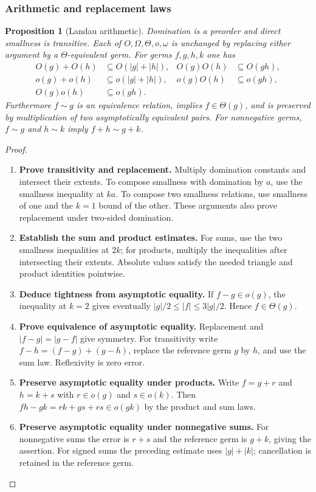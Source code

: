 \documentclass[11pt,a4paper]{article}
\numberwithin{algorithm}{section}
\numberwithin{equation}{section}
\newtheorem{proposition}[proposition]{Proposition}
\theoremstyle{definition}
\theoremstyle{remark}
\theoremstyle{plain}
\newcommand{\abs}[1]{\lvert #1\rvert}
\theoremstyle{definition}
\theoremstyle{plain}
\begin{document}
\subsubsection{Arithmetic and replacement laws}
\begin{proposition}[Landau arithmetic]\label{prop:landau-arithmetic}
Domination is a preorder and direct smallness is transitive.
Each of $O,\Omega,\Theta,o,\omega$ is unchanged by replacing
either argument by a $\Theta$-equivalent germ. For germs
$f,g,h,k$ one has
\[
\begin{aligned}
 O(g)+O(h)&\subseteq O(\abs g+\abs h),&
 O(g)O(h)&\subseteq O(gh),\\
 o(g)+o(h)&\subseteq o(\abs g+\abs h),&
 o(g)O(h)&\subseteq o(gh),\\
 O(g)o(h)&\subseteq o(gh).
\end{aligned}
\]
Furthermore $f\sim g$ is an equivalence relation, implies
$f\in\Theta(g)$, and is preserved by multiplication of two
asymptotically equivalent pairs. For nonnegative germs,
$f\sim g$ and $h\sim k$ imply $f+h\sim g+k$.
\end{proposition}
\begin{proof}\leavevmode
\begin{enumerate}[leftmargin=*,align=left]
\item \textbf{Prove transitivity and replacement.}
Multiply domination constants and intersect their extents.
To compose smallness with domination by $a$, use the smallness
inequality at $ka$. To compose two smallness relations, use
smallness of one and the $k=1$ bound of the other. These
arguments also prove replacement under two-sided domination.

\item \textbf{Establish the sum and product estimates.}
For sums, use the two smallness inequalities at $2k$;
for products, multiply the inequalities after intersecting
their extents. Absolute values satisfy the needed triangle
and product identities pointwise.

\item \textbf{Deduce tightness from asymptotic equality.}
If $f-g\in o(g)$, the
inequality at $k=2$ gives eventually
$\abs g/2\le\abs f\le3\abs g/2$. Hence $f\in\Theta(g)$.

\item \textbf{Prove equivalence of asymptotic equality.}
Replacement and $\abs{f-g}=\abs{g-f}$ give symmetry.
For transitivity write $f-h=(f-g)+(g-h)$, replace the
reference germ $g$ by $h$, and use the sum law.
Reflexivity is zero error.

\item \textbf{Preserve asymptotic equality under products.}
Write $f=g+r$ and $h=k+s$ with $r\in o(g)$ and $s\in o(k)$.
Then $fh-gk=rk+gs+rs\in o(gk)$ by the product and sum laws.

\item \textbf{Preserve asymptotic equality under nonnegative sums.}
For nonnegative sums the error is $r+s$ and the reference
germ is $g+k$, giving the assertion. For signed
sums the preceding estimate uses $\abs g+\abs k$; cancellation
is retained in the reference germ.
\end{enumerate}
\end{proof}
\end{document}
